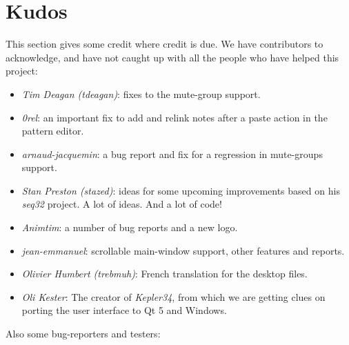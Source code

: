 %
%
%

\section{Kudos}
\label{sec:kudos}

   This section gives some credit where credit is due.
   We have contributors to acknowledge, and have not caught up with all the
   people who have helped this project:

   \begin{itemize}
      \item \textsl{Tim Deagan (tdeagan)}:
         fixes to the mute-group support.
      \item \textsl{0rel}:
         an important fix to add and relink notes after a
         paste action in the pattern editor.
      \item \textsl{arnaud-jacquemin}:
         a bug report and fix for a regression in mute-groups support.
      \item \textsl{Stan Preston (stazed)}:
         ideas for some upcoming improvements based
         on his \textsl{seq32} project.  A lot of ideas.
         And a lot of code!
      \item \textsl{Animtim}:
         a number of bug reports and a new logo.
      \item \textsl{jean-emmanuel}:
         scrollable main-window support, other features and reports.
      \item \textsl{Olivier Humbert (trebmuh)}:
         French translation for the desktop files.
      \item \textsl{Oli Kester}:
         The creator of \textsl{Kepler34}, from which we are getting
         clues on porting the user interface to Qt 5 and Windows.
   \end{itemize}

   Also some bug-reporters and testers:

